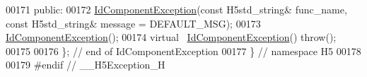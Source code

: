 \begin{DoxyCode}
00171    \textcolor{keyword}{public}:
00172         \hyperlink{class_h5_1_1_id_component_exception}{IdComponentException}(\textcolor{keyword}{const} H5std\_string& func\_name, \textcolor{keyword}{const} H5std\_string& message
       = DEFAULT\_MSG);
00173         \hyperlink{class_h5_1_1_id_component_exception}{IdComponentException}();
00174         \textcolor{keyword}{virtual} ~\hyperlink{class_h5_1_1_id_component_exception}{IdComponentException}() \textcolor{keywordflow}{throw}();
00175 
00176 \}; \textcolor{comment}{// end of IdComponentException}
00177 \} \textcolor{comment}{// namespace H5}
00178 
00179 \textcolor{preprocessor}{#endif // \_\_H5Exception\_H}
\end{DoxyCode}
